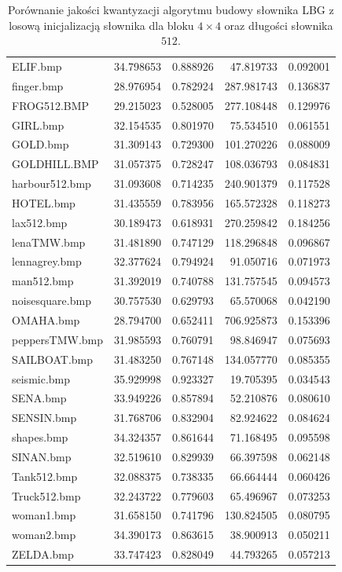 \documentclass{article}
\begin{document}
\begin{table}[ht]
\begin{tabular}{@{}lrrrr@{}}
          ELIF.bmp &  34.798653 &  0.888926 &   47.819733 &  0.092001 \\
        finger.bmp &  28.976954 &  0.782924 &  287.981743 &  0.136837 \\
       FROG512.BMP &  29.215023 &  0.528005 &  277.108448 &  0.129976 \\
          GIRL.bmp &  32.154535 &  0.801970 &   75.534510 &  0.061551 \\
          GOLD.bmp &  31.309143 &  0.729300 &  101.270226 &  0.088009 \\
      GOLDHILL.BMP &  31.057375 &  0.728247 &  108.036793 &  0.084831 \\
    harbour512.bmp &  31.093608 &  0.714235 &  240.901379 &  0.117528 \\
         HOTEL.bmp &  31.435559 &  0.783956 &  165.572328 &  0.118273 \\
        lax512.bmp &  30.189473 &  0.618931 &  270.259842 &  0.184256 \\
       lenaTMW.bmp &  31.481890 &  0.747129 &  118.296848 &  0.096867 \\
     lennagrey.bmp &  32.377624 &  0.794924 &   91.050716 &  0.071973 \\
        man512.bmp &  31.392019 &  0.740788 &  131.757545 &  0.094573 \\
   noisesquare.bmp &  30.757530 &  0.629793 &   65.570068 &  0.042190 \\
         OMAHA.bmp &  28.794700 &  0.652411 &  706.925873 &  0.153396 \\
    peppersTMW.bmp &  31.985593 &  0.760791 &   98.846947 &  0.075693 \\
      SAILBOAT.bmp &  31.483250 &  0.767148 &  134.057770 &  0.085355 \\
       seismic.bmp &  35.929998 &  0.923327 &   19.705395 &  0.034543 \\
          SENA.bmp &  33.949226 &  0.857894 &   52.210876 &  0.080610 \\
        SENSIN.bmp &  31.768706 &  0.832904 &   82.924622 &  0.084624 \\
        shapes.bmp &  34.324357 &  0.861644 &   71.168495 &  0.095598 \\
         SINAN.bmp &  32.519610 &  0.829939 &   66.397598 &  0.062148 \\
       Tank512.bmp &  32.088375 &  0.738335 &   66.664444 &  0.060426 \\
      Truck512.bmp &  32.243722 &  0.779603 &   65.496967 &  0.073253 \\
        woman1.bmp &  31.658150 &  0.741796 &  130.824505 &  0.080795 \\
        woman2.bmp &  34.390173 &  0.863615 &   38.900913 &  0.050211 \\
         ZELDA.bmp &  33.747423 &  0.828049 &   44.793265 &  0.057213 \\
\bottomrule
\end{tabular}
\caption{Porównanie jakości kwantyzacji algorytmu budowy słownika LBG z losową inicjalizacją słownika dla bloku $4 \times 4$ oraz długości słownika $512$.}
\label{tab:lbg_random}
\end{table}
\end{document}
